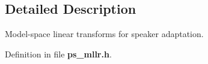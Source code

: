 \subsection{Detailed Description}
Model-\/space linear transforms for speaker adaptation. 

Definition in file {\bf ps\-\_\-mllr.\-h}.

